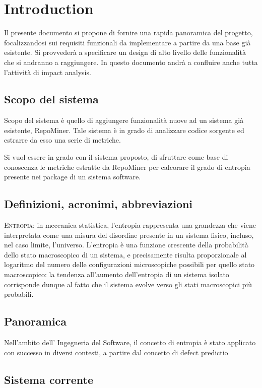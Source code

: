 \chapter{Introduction}
Il presente documento si propone di fornire una rapida panoramica del progetto, focalizzandosi sui requisiti funzionali da implementare a partire da una base già esistente. Si provvederà a specificare un design di alto livello delle funzionalità che si andranno a raggiungere. In questo documento andrà a confluire anche tutta l'attività di impact analysis.

\section{Scopo del sistema}
Scopo del sistema è quello di aggiungere funzionalità nuove ad un sistema già esistente, RepoMiner. Tale sistema è in grado di analizzare codice sorgente ed estrarre da esso una serie di metriche. 

Si vuol essere in grado con il sistema proposto, di sfruttare come base di conoscenza le metriche estratte da RepoMiner per calcorare il grado di entropia presente nei package di un sistema software.

\section{Definizioni, acronimi, abbreviazioni}
\textsc{Entropia}: in meccanica statistica, l'entropia rappresenta una grandezza che viene interpretata come una misura del disordine presente in un sistema fisico, incluso, nel caso limite, l'universo. L'entropia è una funzione crescente della probabilità dello stato macroscopico di un sistema, e precisamente risulta proporzionale al logaritmo del numero delle configurazioni microscopiche possibili per quello stato macroscopico: la tendenza all'aumento dell'entropia di un sistema isolato corrisponde dunque al fatto che il sistema evolve verso gli stati macroscopici più probabili. \\

\section{Panoramica}

Nell'ambito dell' Ingegneria del Software, il concetto di entropia è stato applicato con successo in diversi contesti, a partire dal concetto di defect predictio

\section{Sistema corrente}
